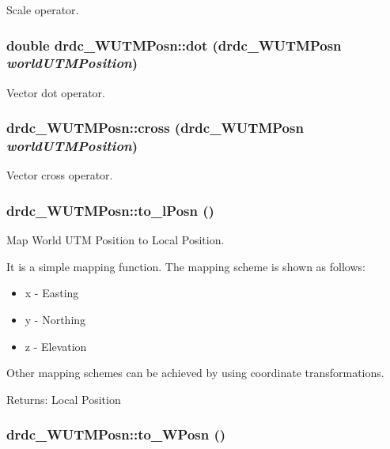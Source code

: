 Scale operator. 

\hypertarget{classdrdc__WUTMPosn_718e139e68caf39f65c919f55d76b1fc}{
\subsubsection[dot]{\setlength{\rightskip}{0pt plus 5cm}double drdc\_\-WUTMPosn::dot ({\bf drdc\_\-WUTMPosn} {\em worldUTMPosition})}}
\label{classdrdc__WUTMPosn_718e139e68caf39f65c919f55d76b1fc}


Vector dot operator. 

\hypertarget{classdrdc__WUTMPosn_4e5c3df2101517981b207471ad925105}{
\subsubsection[cross]{ drdc\_\-WUTMPosn::cross ({\bf drdc\_\-WUTMPosn} {\em worldUTMPosition})}}
\label{classdrdc__WUTMPosn_4e5c3df2101517981b207471ad925105}


Vector cross operator. 

\hypertarget{classdrdc__WUTMPosn_b678adb758987bd816743aef94f3d867}{
\subsubsection[to\_\-lPosn]{ drdc\_\-WUTMPosn::to\_\-lPosn ()}}
\label{classdrdc__WUTMPosn_b678adb758987bd816743aef94f3d867}


Map World UTM Position to Local Position. 

It is a simple mapping function. The mapping scheme is shown as follows:\begin{itemize}
\item x - Easting\item y - Northing\item z - Elevation\end{itemize}


Other mapping schemes can be achieved by using coordinate transformations.

\begin{Desc}
\item[Returns:]Local Position \end{Desc}
\hypertarget{classdrdc__WUTMPosn_17fe9ddb27cbf0bef977e716dafc92c0}{
\subsubsection[to\_\-WPosn]{ drdc\_\-WUTMPosn::to\_\-WPosn ()}}
\label{classdrdc__WUTMPosn_17fe9ddb27cbf0bef977e716dafc92c0}


